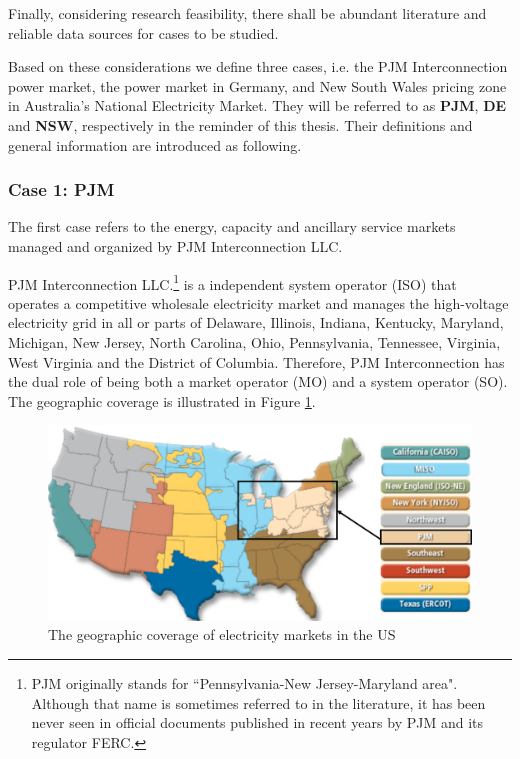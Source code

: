 Finally, considering research feasibility, there shall be abundant literature and reliable data sources for cases to be studied.

Based on these considerations we define three cases, i.e. the PJM Interconnection power market, the power market in Germany, and New South Wales pricing zone in Australia's National Electricity Market. They will be referred to as \textbf{PJM}, \textbf{DE} and \textbf{NSW}, respectively in the reminder of this thesis. Their definitions and general information are introduced as following.

\subsubsection{Case 1: PJM}

The first case refers to the energy, capacity and ancillary service markets managed and organized by PJM Interconnection LLC.

PJM Interconnection LLC.\footnote{PJM originally stands for ``Pennsylvania-New Jersey-Maryland area". Although that name is sometimes referred to in the literature, it has been never seen in official documents published in recent years by PJM and its regulator FERC.} is a independent system operator (ISO) that operates a competitive wholesale electricity market and manages the high-voltage electricity grid in all or parts of Delaware, Illinois, Indiana, Kentucky, Maryland, Michigan, New Jersey, North Carolina, Ohio, Pennsylvania, Tennessee, Virginia, West Virginia and the District of Columbia. Therefore, PJM Interconnection has the dual role of being both a market operator (MO) and a system operator (SO). The geographic coverage is illustrated in Figure \ref{fig:pjm-map}. 

\begin{figure}[h!]
	\centering
	\includegraphics[width=0.95\linewidth]{Figures/US_PowerMarkets}
	\caption{The geographic coverage of electricity markets in the US \cite{FERC_web}}
	\label{fig:pjm-map}
\end{figure}

